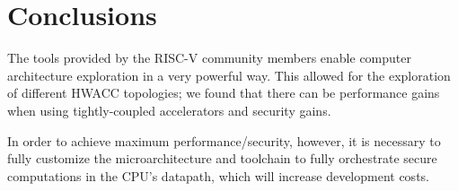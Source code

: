 \documentclass[10pt,conference]{IEEEtran}
\begin{document}
\section{Conclusions}

The tools provided by the RISC-V community members enable computer architecture
exploration in a very powerful way. This allowed for the exploration of
different HWACC topologies; we found that there can be performance gains when
using tightly-coupled accelerators and security gains.

In order to achieve maximum performance/security, however, it is necessary to
fully customize the microarchitecture and toolchain to fully orchestrate secure
computations in the CPU's datapath, which will increase development costs.




\end{document}
